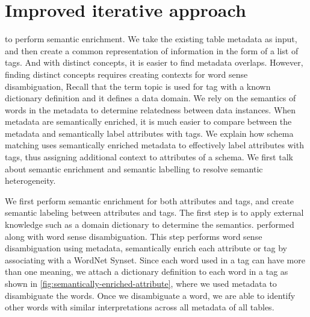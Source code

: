 \section{Improved iterative approach}
\label{sec:ImprovedIterativeApproach}

to perform semantic enrichment. We take the existing table metadata as input, and then create a common representation of information in the form of a list of tags.
And with distinct concepts, it is easier to find metadata overlaps.
However, finding distinct concepts requires creating contexts for word sense disambiguation,
Recall that the term topic is used for tag with a known dictionary definition and it defines a data domain.
We rely on the semantics of words in the metadata to determine relatedness between data instances.
When metadata are semantically enriched, it is much easier to compare between the metadata and semantically label attributes with tags.
We explain how schema matching uses semantically enriched metadata to effectively label attributes with tags, thus assigning additional context to attributes of a schema.
We first talk about semantic enrichment and semantic labelling to resolve semantic heterogeneity.

We first perform semantic enrichment for both attributes and tags, and create semantic labeling between attributes and tags.
The first step is to apply external knowledge such as a domain dictionary to determine the semantics.
performed along with word sense disambiguation.
This step performs word sense disambiguation using metadata, semantically enrich each attribute or tag by associating with a WordNet Synset.
Since each word used in a tag can have more than one meaning, we attach a dictionary definition to each word in a tag as shown in \autoref{fig:semantically-enriched-attribute}, where we used metadata to disambiguate the words.
Once we disambiguate a word, we are able to identify other words with similar interpretations across all metadata of all tables.

